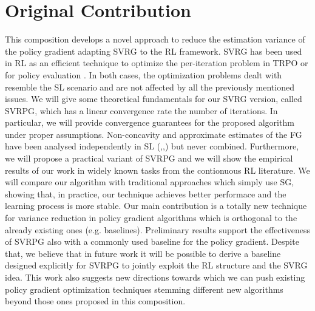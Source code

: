 \section{Original Contribution}
This composition develops a novel approach to reduce the estimation variance of the policy gradient adapting \acs{SVRG} to the \acs{RL} framework.\newline 
\acs{SVRG} has been used in \acs{RL} as an efficient technique to optimize the per-iteration problem in \ac{TRPO} \citep{xu2017stochastic} or for policy evaluation \citep{du2017stochastic}. In both cases, the optimization problems dealt with resemble the \acs{SL} scenario and are not affected by all the previously mentioned issues.
We will give some theoretical fundamentals for our \acs{SVRG} version, called \acf{SVRPG}, which has a linear convergence rate \wrt the number of iterations. In particular, we will provide convergence guarantees for the proposed algorithm under proper assumptions. Non-concavity and approximate estimates of the \acf{FG} have been analysed independently in \acs{SL} (\cite{allen2016variance},\cite{reddi2016stochastic},\cite{harikandeh2015stopwasting}) but never combined.\newline
 Furthermore, we will propose a practical variant of \acs{SVRPG} and we will show the empirical results of our work in widely known tasks from the contionuous \acs{RL} literature. We will compare our algorithm with traditional approaches which simply use \acs{SG}, showing that, in practice, our technique achieves better performace and the learning process is more stable.\newline
Our main contribution is a totally new technique for variance reduction in policy gradient algorithms which is orthogonal to the already existing ones (e.g. baselines).
Preliminary results support the effectiveness of \acs{SVRPG} also with a commonly used baseline for the policy gradient. Despite that, we believe that in future work it will be possible to derive a baseline designed explicitly for \acs{SVRPG} to jointly exploit the \acs{RL} structure and the \acs{SVRG} idea.\newline
This work also suggests new directions towards which we can push existing policy gradient optimization techniques stemming different new algorithms beyond those ones proposed in this composition.\newline
